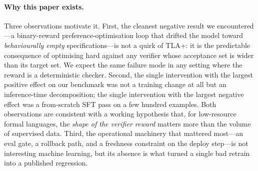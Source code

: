 \documentclass[11pt]{article}
\begin{document}
\paragraph{Why this paper exists.} Three observations motivate it. First,
the cleanest negative result we encountered---a binary-reward
preference-optimisation loop that drifted the model toward
\emph{behaviourally empty} specifications---is not a quirk of TLA+: it is
the predictable consequence of optimising hard against any verifier whose
acceptance set is wider than its target set. We expect the same failure
mode in any setting where the reward is a deterministic checker. Second,
the single intervention with the largest positive effect on our benchmark
was not a training change at all but an inference-time decomposition; the
single intervention with the largest negative effect was a from-scratch
SFT pass on a few hundred examples. Both observations are consistent with
a working hypothesis that, for low-resource formal languages, the
\emph{shape of the verifier reward} matters more than the volume of
supervised data. Third, the operational machinery that mattered most---an
eval gate, a rollback path, and a freshness
constraint on the deploy step---is not interesting machine learning, but
its absence is what turned a single bad retrain into a published
regression.
\end{document}
